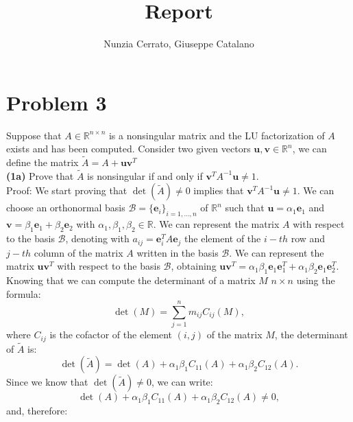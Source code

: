 \documentclass[a4paper]{report}
\newcommand{\R}{\mathbb{R}}
\numberwithin{equation}{chapter}
\begin{document}
	\author{Nunzia Cerrato, Giuseppe Catalano}
	\title{Report}
	\date{}
	\maketitle         
	
	
	
\section*{Problem 3}
Suppose that $A \in \R^{n \times n}$ is a nonsingular matrix and the LU factorization of $A$ exists and has been computed. Consider two given vectors $\textbf{u},\textbf{v}\in \R^n$, we can define the matrix $\tilde{A} = A + \textbf{u}\textbf{v}^T$\\
\textbf{(1a)} Prove that $\tilde{A}$ is nonsingular if and only if $\textbf{v}^TA^{-1}\textbf{u} \neq 1$.\\
Proof: We start proving that $\det(\tilde{A})\neq 0 $ implies that $\textbf{v}^TA^{-1}\textbf{u} \neq 1$. We can choose an orthonormal basis $\mathcal{B} =\{\mathbf{e}_i\}_{i=1,\dots,n}$ of $\R^n$ such that $\mathbf{u} = \alpha_1 \mathbf{e}_1$ and $\mathbf{v} = \beta_1 \mathbf{e}_1 + \beta_2 \mathbf{e}_2$ with $\alpha_1, \beta_1, \beta_2 \in \R$. We can represent the matrix $A$ with respect to the basis $\mathcal{B}$, denoting with $a_{ij} = \textbf{e}^T_i A \textbf{e}_j $  the element of the $i-th$ row and $j-th$ column of the matrix $A$ written in the basis $\mathcal{B}$. We can represent the matrix $ \textbf{u}\textbf{v}^T$ with respect to the basis $\mathcal{B}$, obtaining $\textbf{u}\textbf{v}^T = \alpha_1 \beta_1 \textbf{e}_1 \textbf{e}_1^T +  \alpha_1 \beta_2 \textbf{e}_1 \textbf{e}_2^T$. Knowing that we can compute the determinant of a matrix $M$ $n\times n$ using the formula:
\begin{equation}\label{key}
	\det(M) = \sum_{j=1}^{n} m_{ij} C_{ij}(M),
\end{equation}
where $C_{ij}$ is the cofactor of the element $(i,j)$ of the matrix $M$, the determinant of $\tilde{A}$ is:
\begin{equation}\label{key}
	\det(\tilde{A}) = \det(A) + \alpha_1 \beta_1 C_{11}(A) + \alpha_1 \beta_2 C_{12}(A).
\end{equation}
Since we know that $ \det(\tilde{A}) \neq 0$, we can write:
\begin{equation}\label{key}
	 \det(A) + \alpha_1 \beta_1 C_{11}(A) + \alpha_1 \beta_2 C_{12}(A) \neq 0,
\end{equation}
and, therefore:
\end{document}
